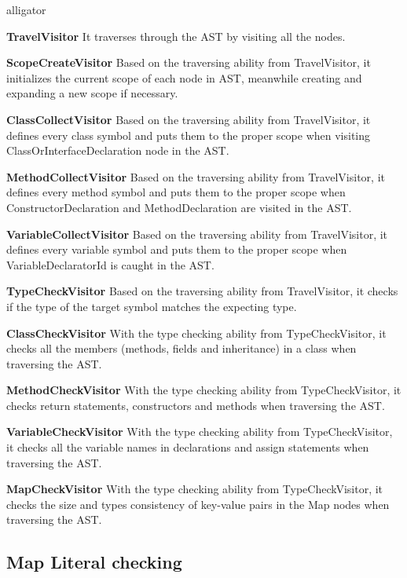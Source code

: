 	\begin{labeling}{alligator}
		\item [\textbf{TravelVisitor}] {It traverses through the AST by visiting all the nodes.}
		\item [\textbf{ScopeCreateVisitor}] {Based on the traversing ability from TravelVisitor, it initializes the current scope of each node in AST, meanwhile creating and expanding a new scope if necessary.}
		\item [\textbf{ClassCollectVisitor}] {Based on the traversing ability from TravelVisitor, it defines every class symbol and puts them to the proper scope when visiting ClassOrInterfaceDeclaration node in the AST.}
		\item [\textbf{MethodCollectVisitor}] {Based on the traversing ability from TravelVisitor, it defines every method symbol and puts them to the proper scope when ConstructorDeclaration and MethodDeclaration are visited in the AST.}
		\item [\textbf{VariableCollectVisitor}] {Based on the traversing ability from TravelVisitor, it defines every variable symbol and puts them to the proper scope when VariableDeclaratorId is caught in the AST.}
		\item [\textbf{TypeCheckVisitor}] {Based on the traversing ability from TravelVisitor, it checks if the type of the target symbol matches the expecting type.}
		\item [\textbf{ClassCheckVisitor}] {With the type checking ability from TypeCheckVisitor, it checks all the members (methods, fields and inheritance) in a class when traversing the AST.}
		\item [\textbf{MethodCheckVisitor}] {With the type checking ability from TypeCheckVisitor, it checks return statements, constructors and methods when traversing the AST.}
		\item [\textbf{VariableCheckVisitor}] {With the type checking ability from TypeCheckVisitor, it checks all the variable names in declarations and assign statements when traversing the AST.}
		\item [\textbf{MapCheckVisitor}] {With the type checking ability from TypeCheckVisitor, it checks the size and types consistency of key-value pairs in the Map nodes when traversing the AST.}
	\end{labeling}
	
	\subsection{Map Literal checking}
	
